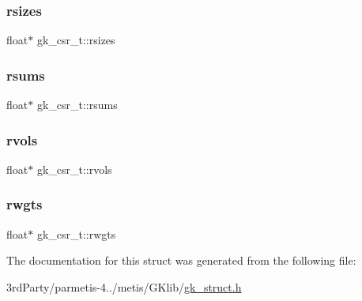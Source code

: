 \mbox{\label{structgk__csr__t_aecea9e455b69114d1fcc883c6d228fb5}} 
\subsubsection{\texorpdfstring{rsizes}{rsizes}}
{\footnotesize\ttfamily float$\ast$ gk\+\_\+csr\+\_\+t\+::rsizes}

\mbox{\label{structgk__csr__t_a6b19f0b4ae40c82ad60c7aa7666c6f4f}} 
\subsubsection{\texorpdfstring{rsums}{rsums}}
{\footnotesize\ttfamily float$\ast$ gk\+\_\+csr\+\_\+t\+::rsums}

\mbox{\label{structgk__csr__t_a3cfbae243c346d2461e52e6985304bbb}} 
\subsubsection{\texorpdfstring{rvols}{rvols}}
{\footnotesize\ttfamily float$\ast$ gk\+\_\+csr\+\_\+t\+::rvols}

\mbox{\label{structgk__csr__t_a1cdf3e25a63376b7feb3c96834f298d6}} 
\subsubsection{\texorpdfstring{rwgts}{rwgts}}
{\footnotesize\ttfamily float$\ast$ gk\+\_\+csr\+\_\+t\+::rwgts}



The documentation for this struct was generated from the following file\+:\begin{DoxyCompactItemize}
\item 
3rd\+Party/parmetis-\/4../metis/\+G\+Klib/\hyperlink{gk__struct_8h}{gk\+\_\+struct.\+h}\end{DoxyCompactItemize}

